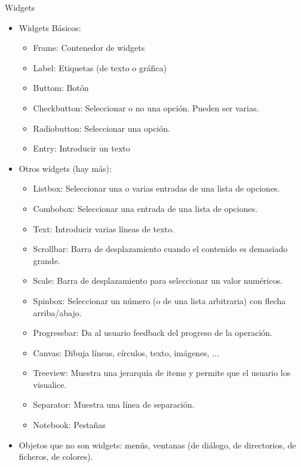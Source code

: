\documentclass[10pt, envcountsect , spanish]{beamer}
\begin{document}
\begin{frame}{Widgets}
\begin{itemize}
\item Widgets Básicos:
	\begin{itemize}
	\item Frame: Contenedor de widgets
	\item Label: Etiquetas (de texto o gráfica)
	\item Buttom: Botón
	\item Checkbutton: Seleccionar o no una opción. Pueden ser varias.
	\item Radiobutton:  Seleccionar una opción. 
	\item Entry: Introducir un texto
	\end{itemize}
	
\item Otros widgets (hay más):
	\begin{itemize}
	\item Listbox: Seleccionar una o varias entradas de una lista de opciones.
	\item Combobox: Seleccionar una entrada de una lista de opciones.
	\item Text: Introducir varias líneas de texto.
	\item Scrollbar: Barra de desplazamiento cuando el contenido es demasiado grande.
	\item Scale: Barra de desplazamiento para seleccionar un valor numéricos.
	\item Spinbox: Seleccionar un número (o de  una lista arbitraria) con flecha arriba/abajo.
	\item Progressbar: Da al usuario feedback del progreso de la operación.
	\item Canvas: Dibuja líneas, círculos, texto, imágenes, ...
	\item Treeview: Muestra una jerarquía de items y permite que el usuario los visualice.
	\item Separator: Muestra una línea de separación.
	\item Notebook: Pestañas
	\end{itemize}

\item Objetos que no son widgets: menús, ventanas (de diálogo, de directorios, de ficheros, de colores).

\end{itemize}
\end{frame}
\end{document}
